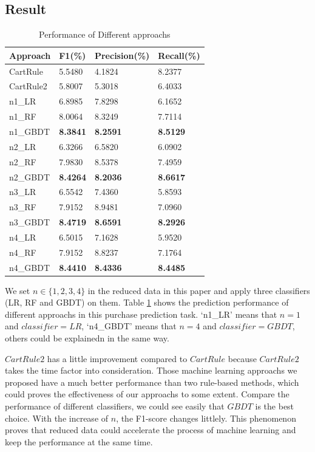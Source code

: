 \documentclass{llncs}
\begin{document}
\subsection{Result}
\begin{table}[htbp]
	\normalsize
	\centering
	\caption{Performance of Different approachs}
	\begin{tabular}{|p{60pt}|p{60pt}|p{60pt}|p{60pt}|}
		\hline
		Approach & F1(\%) & Precision(\%) & Recall(\%) \\
		\hline
		CartRule & 5.5480 & 4.1824 & 8.2377 \\
		CartRule2 & 5.8007 & 5.3018 & 6.4033 \\
		\hline
		n1\_LR & 6.8985 & 7.8298 & 6.1652 \\
		n1\_RF & 8.0064 & 8.3249 & 7.7114 \\
		n1\_GBDT & \textbf{8.3841} & \textbf{8.2591} & \textbf{8.5129} \\
		\hline
		n2\_LR & 6.3266 & 6.5820 & 6.0902 \\
		n2\_RF & 7.9830 & 8.5378 & 7.4959 \\
		n2\_GBDT & \textbf{8.4264} & \textbf{8.2036} & \textbf{8.6617} \\
		\hline
		n3\_LR & 6.5542 & 7.4360 & 5.8593 \\
		n3\_RF & 7.9152 & 8.9481 & 7.0960 \\
		n3\_GBDT & \textbf{8.4719} & \textbf{8.6591} & \textbf{8.2926} \\
		\hline
		n4\_LR & 6.5015 & 7.1628 & 5.9520 \\
		n4\_RF & 7.9152 & 8.8237 & 7.1764 \\
		n4\_GBDT & \textbf{8.4410} & \textbf{8.4336} & \textbf{8.4485} \\
		\hline
	\end{tabular}
	\label{tab:score}
\end{table}

We set $n \in \{ 1, 2, 3, 4\}$ in the reduced data in this paper
and apply three classifiers (LR, RF and GBDT) on them.
Table \ref{tab:score} shows the prediction performance of different approachs
in this purchase prediction task.
`n1\_LR' means that $n = 1$ and $classifier = LR$,
`n4\_GBDT' means that $n = 4$ and $classifier = GBDT$,
others could be explainedn in the same way.

$CartRule2$ has a little improvement compared to $CartRule$
because $CartRule2$ takes the time factor into consideration.
Those machine learning approachs we proposed have a much better performance
than two rule-based methods, which could proves the effectiveness of our approachs to some extent.
Compare the performance of different classifiers,
we could see easily that $GBDT$ is the best choice.
With the increase of $n$, the F1-score changes littlely.
This phenomenon proves that reduced data could accelerate
the process of machine learning and keep the performance at the same time.
\end{document}
